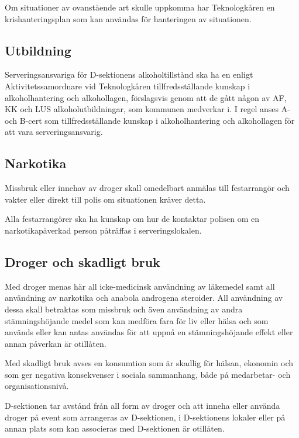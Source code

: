 \documentclass[]{dsekprotokoll}
\begin{document}
Om situationer av ovanstående art skulle uppkomma har Teknologkåren en krishanteringsplan som kan användas för hanteringen av situationen.

\subsection{Utbildning}
Serveringsansvariga för D-sektionens alkoholtillstånd ska ha en enligt Aktivitetssamordnare vid Teknologkåren tillfredsställande kunskap i alkoholhantering och alkohollagen, förslagsvis genom att de gått någon av AF, KK och LUS alkoholutbildningar, som kommunen medverkar i. I regel anses A- och B-cert som tillfredsställande kunskap i alkoholhantering och alkohollagen för att vara serveringsansvarig.

\subsection{Narkotika}
Missbruk eller innehav av droger skall omedelbart anmälas till festarrangör och vakter eller
direkt till polis om situationen kräver detta.

Alla festarrangörer ska ha kunskap om hur de kontaktar polisen om en narkotikapåverkad person påträffas i serveringslokalen.

\subsection{Droger och skadligt bruk}
Med droger menas här all icke-medicinsk användning av läkemedel samt all användning av
narkotika och anabola androgena steroider. All användning av dessa skall betraktas som
missbruk och även användning av andra stämningshöjande medel som kan medföra fara för
liv eller hälsa och som används eller kan antas användas för att uppnå en stämningshöjande
effekt eller annan påverkan är otillåten.

Med skadligt bruk avses en konsumtion som är skadlig för hälsan, ekonomin och som ger negativa konsekvenser i sociala sammanhang, både på medarbetar- och organisationsnivå.

D-sektionen tar avstånd från all form av droger och att inneha eller använda droger på event
som arrangeras av D-sektionen, i D-sektionens lokaler eller på annan plats som kan associeras med D-sektionen är otillåten.
\end{document}
